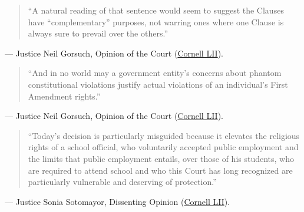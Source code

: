 \documentclass[12pt]{article}
\begin{document}
\begin{quote}
``A natural reading of that sentence would seem to suggest the Clauses have ``complementary'' purposes, not warring ones where one Clause is always sure to prevail over the others.''
\end{quote}
\noindent --- Justice Neil Gorsuch, Opinion of the Court (\href{https://www.law.cornell.edu/supremecourt/text/21-418}{Cornell LII}).

\begin{quote}
``And in no world may a government entity's concerns about phantom constitutional violations justify actual violations of an individual's First Amendment rights.''
\end{quote}
\noindent --- Justice Neil Gorsuch, Opinion of the Court (\href{https://www.law.cornell.edu/supremecourt/text/21-418}{Cornell LII}).

\begin{quote}
``Today's decision is particularly misguided because it elevates the religious rights of a school official, who voluntarily accepted public employment and the limits that public employment entails, over those of his students, who are required to attend school and who this Court has long recognized are particularly vulnerable and deserving of protection.''
\end{quote}
\noindent --- Justice Sonia Sotomayor, Dissenting Opinion (\href{https://www.law.cornell.edu/supremecourt/text/21-418}{Cornell LII}).
\end{document}
